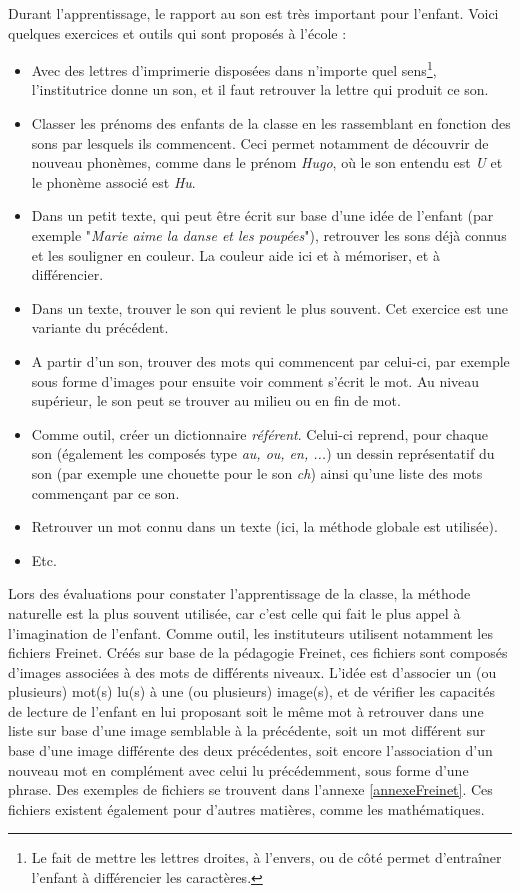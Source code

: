 Durant l'apprentissage, le rapport au son est très important pour l'enfant. Voici quelques exercices et outils qui sont proposés à l'école :
\begin{itemize}
\item Avec des lettres d'imprimerie disposées dans n'importe quel sens\footnote{Le fait de mettre les lettres droites, à l'envers, ou de côté permet d'entraîner l'enfant à différencier les caractères.}, l'institutrice donne un son, et il faut retrouver la lettre qui produit ce son.
\item Classer les prénoms des enfants de la classe en les rassemblant en fonction des sons par lesquels ils commencent. Ceci permet notamment de découvrir de nouveau phonèmes, comme dans le prénom \textit{Hugo}, où le son entendu est \textit{U} et le phonème associé est \textit{Hu}.
\item Dans un petit texte, qui peut être écrit sur base d'une idée de l'enfant (par exemple "\textit{Marie aime la danse et les poupées}"), retrouver les sons déjà connus et les souligner en couleur. La couleur aide ici et à mémoriser, et à différencier.
\item Dans un texte, trouver le son qui revient le plus souvent. Cet exercice est une variante du précédent.
\item A partir d'un son, trouver des mots qui commencent par celui-ci, par exemple sous forme d'images pour ensuite voir comment s'écrit le mot. Au niveau supérieur, le son peut se trouver au milieu ou en fin de mot.
\item Comme outil, créer un dictionnaire \textit{référent}. Celui-ci reprend, pour chaque son (également les composés type \textit{au, ou, en, ...}) un dessin représentatif du son (par exemple une chouette pour le son \textit{ch}) ainsi qu'une liste des mots commençant par ce son.
\item Retrouver un mot connu dans un texte (ici, la méthode globale est utilisée).
\item Etc.\\
\end{itemize}

Lors des évaluations pour constater l'apprentissage de la classe, la méthode naturelle est la plus souvent utilisée, car c'est celle qui fait le plus appel à l'imagination de l'enfant. Comme outil, les instituteurs utilisent notamment les fichiers Freinet. Créés sur base de la pédagogie Freinet, ces fichiers sont composés d'images associées à des mots de différents niveaux. L'idée est d'associer un (ou plusieurs) mot(s) lu(s) à une (ou plusieurs) image(s), et de vérifier les capacités de lecture de l'enfant en lui proposant soit le même mot à retrouver dans une liste sur base d'une image semblable à la précédente, soit un mot différent sur base d'une image différente des deux précédentes, soit encore l'association d'un nouveau mot en complément avec celui lu précédemment, sous forme d'une phrase. Des exemples de fichiers se trouvent dans l'annexe \ref{annexeFreinet}. Ces fichiers existent également pour d'autres matières, comme les mathématiques.\\

